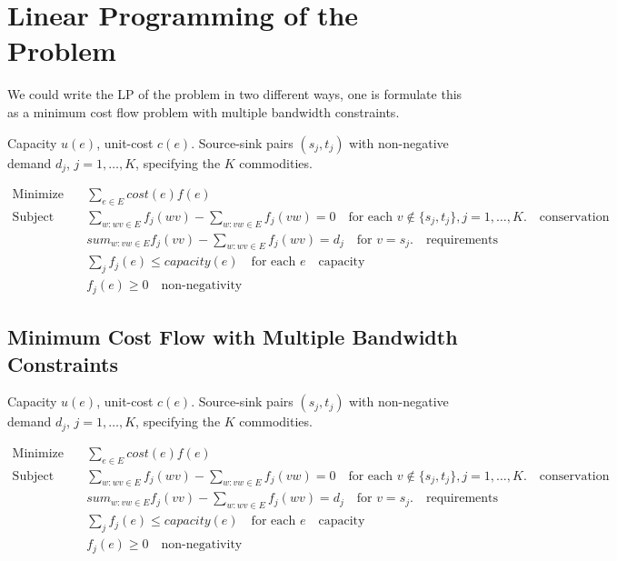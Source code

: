 \documentclass[a4paper]{article}
\begin{document}



\section {Linear Programming of the Problem}
We could write the LP of the problem in two different ways, one is formulate this as a minimum cost flow problem with multiple bandwidth constraints.

Capacity $u(e)$, unit-cost $c(e)$. Source-sink pairs $(s_j, t_j)$ with non-negative demand $d_j$, $j = 1, \dots, K$, specifying the $K$ commodities. 

\begin{align*}
\text{Minimize} & \quad \sum_{e\in E} cost(e)f(e) \\
\text{Subject To} & \quad \sum_{w:wv\in E}f_j(wv) - \sum_{w:vw\in E} f_j(vw) = 0 \quad \text {for each } v\notin \{s_j, t_j \}, j=1,\dots, K. \quad \text{conservation}\\
 & \quad sum_{w:vw\in E}f_j(vv) - \sum_{w:wv\in E} f_j(wv) = d_j \quad \text{for } v = s_j. \quad \text{requirements} \\
 & \quad \sum_j f_j(e) \leq capacity(e) \quad \text{for each }e \quad \text{capacity} \\ 
 & \quad f_j(e) \geq 0 \quad \text{non-negativity} 
\end{align*}


\subsection{Minimum Cost Flow with Multiple Bandwidth Constraints}

Capacity $u(e)$, unit-cost $c(e)$. Source-sink pairs $(s_j, t_j)$ with non-negative demand $d_j$, $j = 1, \dots, K$, specifying the $K$ commodities. 

\begin{align*}
\text{Minimize} & \quad \sum_{e\in E} cost(e)f(e) \\
\text{Subject To} & \quad \sum_{w:wv\in E}f_j(wv) - \sum_{w:vw\in E} f_j(vw) = 0 \quad \text {for each } v\notin \{s_j, t_j \}, j=1,\dots, K. \quad \text{conservation}\\
 & \quad sum_{w:vw\in E}f_j(vv) - \sum_{w:wv\in E} f_j(wv) = d_j \quad \text{for } v = s_j. \quad \text{requirements} \\
 & \quad \sum_j f_j(e) \leq capacity(e) \quad \text{for each }e \quad \text{capacity} \\ 
 & \quad f_j(e) \geq 0 \quad \text{non-negativity} 
\end{align*}
\end{document}

